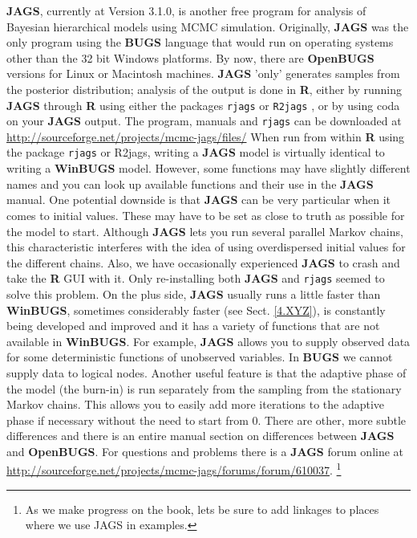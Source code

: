 {\bf JAGS}, currently at Version 3.1.0, is another free program for analysis 
of Bayesian hierarchical models using MCMC simulation. Originally, {\bf JAGS}
 was the only program using the {\bf BUGS} language that would run on 
 operating systems other than the 32 bit Windows platforms. By now, there 
 are {\bf OpenBUGS} versions for Linux or Macintosh machines.
{\bf JAGS} 'only' generates samples from the posterior distribution; 
analysis of the output is done in {\bf R}, either by running {\bf JAGS} 
through {\bf R} using either the packages \mbox{\tt rjags} 
\citep{plummer:2011} or \mbox{\tt R2jags} \citep{su_yajima:2011}, or by 
using coda on your {\bf JAGS} output. The program, manuals and \mbox{\tt rjags} 
can be downloaded at \url{http://sourceforge.net/projects/mcmc-jags/files/}
When run from within {\bf R} using the package \mbox{\tt rjags} or \mbox{R2jags}, 
writing a \mbox{\bf JAGS} model is virtually identical to writing a {\bf WinBUGS}
 model. However, some functions may have slightly different names and you 
 can look up available functions and their use in the {\bf JAGS} 
 manual. One potential downside is that {\bf JAGS} can be very particular 
 when it comes to initial values. These may have to be set as close to 
 truth as possible for the model to start. Although {\bf JAGS} lets 
 you run several parallel Markov chains, this characteristic interferes 
 with the idea of using overdispersed initial values for the different 
 chains. Also, we have occasionally experienced {\bf JAGS} to crash and 
 take the {\bf R} GUI with it. Only re-installing both {\bf JAGS} and 
 {\tt rjags} seemed to solve this problem.
On the plus side, {\bf JAGS} usually runs a little faster than {\bf WinBUGS},
 sometimes considerably faster (see Sect. \ref {4.XYZ}), is constantly 
 being developed and improved and it has a variety of functions that are 
 not available in {\bf WinBUGS}. For example, {\bf JAGS} allows you to 
 supply observed data for some deterministic functions of unobserved 
 variables. In {\bf BUGS} we cannot supply data to logical nodes. 
 Another useful feature is that the adaptive phase of the model 
 (the burn-in) is run separately from the sampling from the stationary 
 Markov chains. This allows you to easily add more iterations to the 
 adaptive phase if necessary without the need to start from 0. There 
 are other, more subtle differences and there is an entire manual section 
 on differences between {\bf JAGS} and {\bf OpenBUGS}.
For questions and problems there is a {\bf JAGS} forum online at 
\url{http://sourceforge.net/projects/mcmc-jags/forums/forum/610037}.
\footnote{As we make progress on the book, lets be sure  to add 
linkages to places where we use JAGS in examples.}

